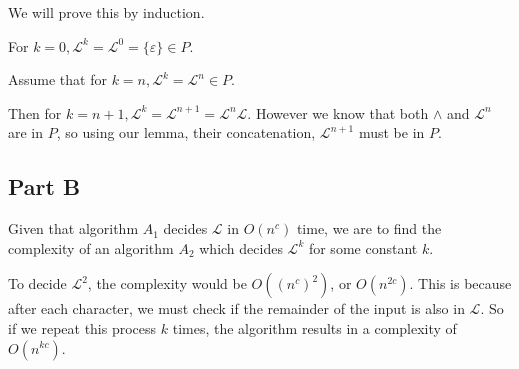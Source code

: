 \documentclass{article}
\newcommand{\lang}{\mathcal{L}}
\begin{document}
We will prove this by induction.

For \(k = 0, \lang^k = \lang^0 = \{\varepsilon\} \in P\).

Assume that for \(k = n, \lang^k = \lang^n \in P\).

Then for \(k = n + 1, \lang^k = \lang^{n+1} = \lang^n \lang\). However we know that both \(\land\) and \(\lang^n\) are in \(P\), so using our lemma, their concatenation, \(\lang^{n+1}\) must be in \(P\).

\subsection*{Part B}

Given that algorithm \(A_1\) decides \(\lang\) in \(O(n^c)\) time, we are to find the complexity of an algorithm \(A_2\) which decides \(\lang^k\) for some constant \(k\).

To decide \(\lang^2\), the complexity would be \(O((n^c)^2)\), or \(O(n^{2c})\). This is because after each character, we must check if the remainder of the input is also in \(\lang\). So if we repeat this process \(k\) times, the algorithm results in a complexity of \(O(n^{kc})\).
\end{document}
